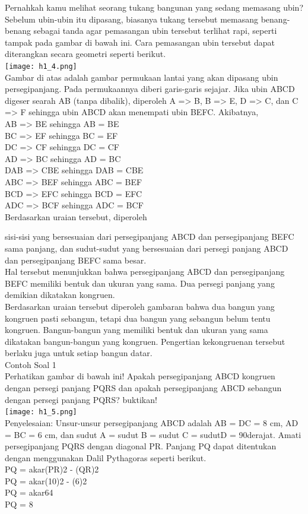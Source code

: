\documentclass[11pt,fleqn]{book} %
\begin{document}
Pernahkah kamu melihat seorang tukang bangunan yang sedang memasang ubin? Sebelum ubin-ubin itu dipasang, biasanya tukang tersebut memasang benang-benang sebagai tanda agar pemasangan ubin tersebut terlihat rapi, seperti tampak pada gambar di bawah ini. Cara pemasangan ubin tersebut dapat diterangkan secara geometri seperti berikut.\\
 \texttt{[image: h1\_4.png]}\\
Gambar di atas adalah gambar permukaan lantai yang akan dipasang ubin persegipanjang. Pada permukaannya diberi garis-garis sejajar. Jika ubin ABCD digeser searah AB (tanpa dibalik), diperoleh A => B, B => E, D => C, dan C => F sehingga ubin ABCD akan menempati ubin BEFC. Akibatnya,\\
AB => BE sehingga AB = BE\\
BC => EF sehingga BC = EF\\
DC => CF sehingga DC = CF\\
AD => BC sehingga AD = BC\\
DAB =>  CBE sehingga DAB = CBE\\
ABC =>  BEF sehingga ABC = BEF\\
BCD =>  EFC sehingga BCD = EFC\\
ADC =>  BCF sehingga ADC = BCF\\
Berdasarkan uraian tersebut, diperoleh

sisi-sisi yang bersesuaian dari persegipanjang ABCD dan persegipanjang BEFC sama panjang, dan
sudut-sudut yang bersesuaian dari persegi panjang ABCD dan persegipanjang BEFC sama besar.\\

Hal tersebut menunjukkan bahwa persegipanjang ABCD dan persegipanjang BEFC memiliki bentuk dan ukuran yang sama. Dua persegi panjang yang demikian dikatakan kongruen.\\

Berdasarkan uraian tersebut diperoleh gambaran bahwa dua bangun yang kongruen pasti sebangun, tetapi dua bangun yang sebangun belum tentu kongruen. Bangun-bangun yang memiliki bentuk dan ukuran yang sama dikatakan bangun-bangun yang kongruen. Pengertian kekongruenan tersebut berlaku juga untuk setiap bangun datar.\\

Contoh Soal 1\\
Perhatikan gambar di bawah ini! Apakah persegipanjang ABCD kongruen dengan persegi panjang PQRS dan  apakah persegipanjang ABCD sebangun dengan persegi panjang PQRS? buktikan!\\
 \texttt{[image: h1\_5.png]}\\
Penyelesaian:
Unsur-unsur persegipanjang ABCD adalah AB = DC = 8 cm, AD = BC = 6 cm, dan sudut A = sudut B = sudut C = sudutD = 90derajat. Amati persegipanjang PQRS dengan diagonal PR. Panjang PQ dapat ditentukan dengan menggunakan Dalil Pythagoras seperti berikut.\\
PQ = akar(PR)2 - (QR)2\\
PQ = akar(10)2 - (6)2\\
PQ = akar64\\
PQ = 8\\
\end{document}
